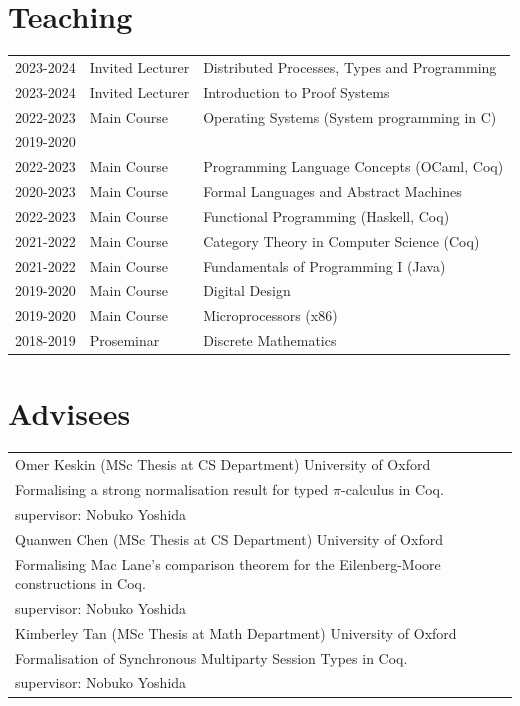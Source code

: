 \documentclass[a4paper,9pt]{article} %
\begin{document}
\section*{Teaching}

\begin{longtable}{lll}
2023-2024 & Invited Lecturer & Distributed Processes, Types and Programming
\\[0.15cm]	
2023-2024 & Invited Lecturer & Introduction to Proof Systems
\\[0.15cm]
2022-2023 & Main Course & Operating Systems (System programming in C)
\\[0.15cm]
2019-2020 & \\
2022-2023 & Main Course & Programming Language Concepts (OCaml, Coq)
\\[0.15cm]
2020-2023 & Main Course & Formal Languages and Abstract Machines  
\\[0.15cm]
2022-2023 & Main Course & Functional Programming (Haskell, Coq)  
\\[0.15cm]
2021-2022 & Main Course & Category Theory in Computer Science  (Coq)
\\[0.15cm]
2021-2022 & Main Course & Fundamentals of Programming I (Java)
\\[0.15cm]
2019-2020 & Main Course & Digital Design 
\\[0.15cm]
2019-2020 & Main Course & Microprocessors (x86)
\\[0.15cm]
2018-2019 & Proseminar & Discrete Mathematics
\end{longtable}

\section*{Advisees}

\begin{longtable}{l}
Omer Keskin (MSc Thesis at CS Department)  University of Oxford  \\
Formalising a strong normalisation result for typed $\pi$-calculus in Coq. \\ 
supervisor: Nobuko Yoshida
\\[0.20cm]
Quanwen Chen (MSc Thesis at CS Department) University of Oxford  \\
Formalising Mac Lane's comparison theorem for the Eilenberg-Moore constructions in Coq.\\
supervisor: Nobuko Yoshida
\\[0.20cm]
Kimberley Tan (MSc Thesis at Math Department)  University of Oxford  \\
Formalisation of Synchronous Multiparty Session Types in Coq.\\
supervisor: Nobuko Yoshida


\end{longtable}
\end{document}
